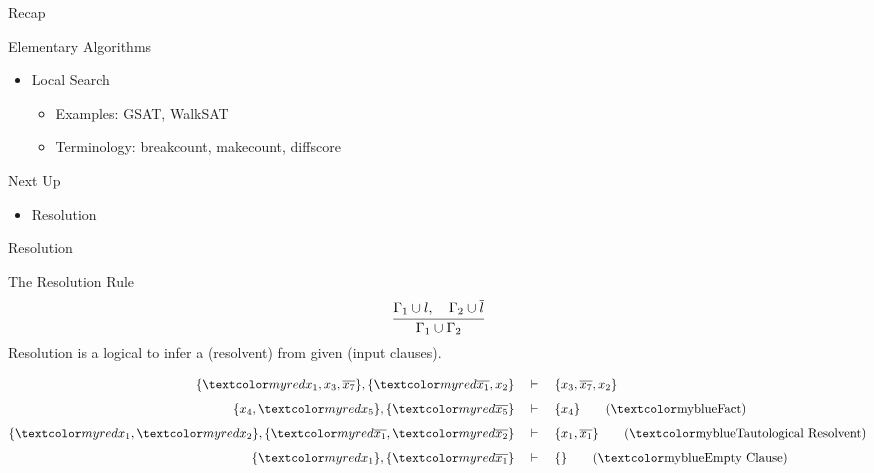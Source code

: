\documentclass[t]{sdqbeamer}
\begin{document}
\begin{frame}{Recap}
\begin{block}{Elementary Algorithms}
	\begin{itemize}\setlength{\itemsep}{1em}
		\item Local Search
		\begin{itemize}\setlength{\itemsep}{1ex}
			\item Examples: GSAT, WalkSAT
			\item Terminology: breakcount, makecount, diffscore
		\end{itemize}
	\end{itemize}
\end{block}
\pause
\begin{block}{Next Up}
	\begin{itemize}\setlength{\itemsep}{1em}
		\item Resolution
	\end{itemize}
\end{block}
\end{frame}


\begin{frame}{Resolution}
\begin{block}{The Resolution Rule}
\vspace*{-3ex}
\begin{align*}
	\cfrac{\Gamma_1 \cup l,\quad \Gamma_2 \cup \overline{l}}{\Gamma_1 \cup \Gamma_2}
\end{align*}
Resolution is a logical  to infer a  (resolvent) from given  (input clauses).
\end{block}
	
\begin{example}[Resolution]
\vspace*{-3ex}
\begin{align*}
	\{ \highlo{x_1}, x_3, \overline{x_7} \}, \{ \highlo{\overline{x_1}}, x_2 \} \quad &\vdash \quad \{ x_3, \overline{x_7}, x_2 \} \\[1ex]
	\{ x_4, \highlo{x_5} \}, \{ \highlo{\overline{x_5}} \} \quad &\vdash \quad \{ x_4 \} \tag{\highl{Fact}}\\[1ex]
	\{ \highlo{x_1}, \highlo{x_2} \}, \{ \highlo{\overline{x_1}, \highlo{\overline{x_2}}} \} \quad &\vdash \quad \{ x_1, \overline{x_1} \} \tag{\highl{Tautological Resolvent}} \\[1ex]
	\{ \highlo{x_1} \}, \{ \highlo{\overline{x_1}} \} \quad &\vdash \quad \{ \} \tag{\highl{Empty Clause}}
\end{align*}
\end{example}
\end{frame}
	
\end{document}
